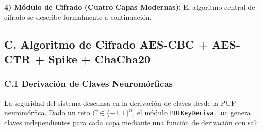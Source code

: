 \begin{table}[H]
    \centering
    \caption{Esquema completo de la base de datos \texttt{crypto\_puf}}
    \label{tab:db-schema}
    \footnotesize\setlength{\tabcolsep}{3pt}
\end{table}

\textbf{4) Módulo de Cifrado (Cuatro Capas Modernas):} El algoritmo central de cifrado se describe formalmente a continuación.

\subsection*{C. Algoritmo de Cifrado AES-CBC + AES-CTR + Spike + ChaCha20}

\subsubsection*{C.1 Derivación de Claves Neuromórficas}

La seguridad del sistema descansa en la derivación de claves desde la PUF neuromórfica. Dado un reto $C \in \{-1,1\}^{n}$, el módulo \texttt{PUFKeyDerivation} genera claves independientes para cada capa mediante una función de derivación con sal:

